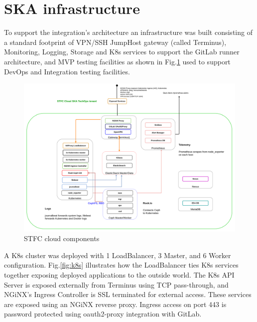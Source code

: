 \documentclass[a4paper,
	       keeplastbox,   %
	       References
	       ]{jacow}
\begin{document}
\section{SKA infrastructure}

To support the integration's architecture an infrastructure was built consisting of a standard footprint of VPN/SSH JumpHost gateway (called Terminus), Monitoring, Logging, Storage and K8s services to support the GitLab\cite{gitlab} runner architecture, and MVP testing facilities as shown in Fig.\ref{fig:stfc-cloud-component} used to support DevOps and Integration testing facilities.

\begin{figure}[!htb]
	\centering
	\includegraphics*[width=0.8\columnwidth]{stfc-cloud-component}
	\caption{STFC cloud components}
	\label{fig:stfc-cloud-component}
\end{figure}

A K8s cluster was deployed with 1 LoadBalancer, 3 Master, and 6 Worker configuration. Fig.\ref{fig:k8s} illustrates how the LoadBalancer ties K8s services together exposing deployed applications to the outside world. The K8s API Server is exposed externally from Terminus using TCP pass-through, and NGiNX\cite{nginx}'s Ingress Controller is SSL terminated for external access. These services are exposed using an NGiNX reverse proxy. Ingress access on port 443 is password protected using oauth2-proxy\cite{oauth2proxy} integration with GitLab.
\end{document}
